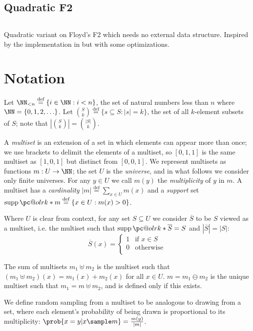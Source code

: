 \documentclass[letterpaper,luatex,11pt]{article}
\makeatletter
\renewcommand{\supportname}{supp}
\renewcommand{\supp}[1]{\ensuremath{\operatorname{\supportname}\pc@olrk*{#1}}}
\newcommand*{\defeq}{\stackrel{\text{def}}{=}}
\makeatother
\begin{document}
\subsection{Quadratic F2}
\inputminted{Python}{code/quadraticf2.py}
Quadratic variant on Floyd's F2 which needs no external data
structure. Inspired by the implementation in \cite{rust-random} but
with some optimizations.

\section{Notation}

Let \(\NN_{<n} \defeq \{i \in \NN: i < n\}\), the set of natural
numbers less than \(n\) where \(\NN = \{0, 1, 2, \ldots\}\). Let
\(\binom{S}{k} \defeq \{s \subseteq S: |s| = k\}\), the set of all
\(k\)-element subsets of \(S\); note that \(\left|\binom{S}{k}\right|
= \binom{|S|}{k}\).

A \emph{multiset} is an extension of a set in which elements can
appear more than once; we use brackets to delimit the elements of a
multiset, so $[0, 1, 1]$ is the same multiset as $[1, 0, 1]$ but
distinct from $[0, 0, 1]$. We represent multisets as functions $m: U
\rightarrow \NN$; the set $U$ is the \emph{universe}, and in what
follows we consider only finite universes. For any $y \in U$ we call
$m(y)$ the \emph{multiplicity} of $y$ in $m$. A multiset has a
\emph{cardinality} $|m| \defeq \sum_{x \in U} m(x)$ and a
\emph{support} set $\supp{m} \defeq \{x \in U: m(x) > 0\}$.

Where $U$ is clear from context, for any set $S \subseteq U$ we
consider $\overline{S}$ to be $S$ viewed as a multiset, i.e. the
multiset such that $\supp{\overline{S}} = S$ and $|\overline{S}| =
|S|$:
\begin{displaymath}
    \overline{S}(x) =
    \begin{cases}
        1 & \text{if $x \in S$} \\
        0 & \text{otherwise} \\
    \end{cases}
\end{displaymath}

The sum of multisets $m_1 \uplus m_2$ is the multiset such that $(m_1
\uplus m_2)(x) = m_1(x) + m_2(x)$ for all $x \in U$. $m = m_1 \ominus
m_2$ is the unique multiset such that $m_1 = m \uplus m_2$, and is
defined only if this exists.

We define random sampling from a multiset to be analogous to drawing
from a set, where each element's probability of being drawn is
proportional to its multiplicity: $\prob{x = y |x \sample m} =
\frac{m(y)}{|m|}$.
\end{document}

